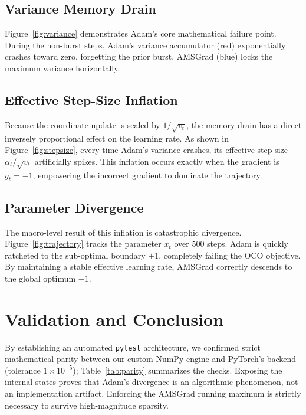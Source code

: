 \documentclass[10pt,twocolumn]{article}
\begin{document}
\subsection{Variance Memory Drain}
Figure~\ref{fig:variance} demonstrates Adam's core mathematical failure point. During the non-burst steps, Adam's variance accumulator (red) exponentially crashes toward zero, forgetting the prior burst. AMSGrad (blue) locks the maximum variance horizontally.

\subsection{Effective Step-Size Inflation}
Because the coordinate update is scaled by $1/\sqrt{v_t}$, the memory drain has a direct inversely proportional effect on the learning rate. As shown in Figure~\ref{fig:stepsize}, every time Adam's variance crashes, its effective step size $\alpha_t/\sqrt{v_t}$ artificially spikes. This inflation occurs exactly when the gradient is $g_t=-1$, empowering the incorrect gradient to dominate the trajectory.

\subsection{Parameter Divergence}
The macro-level result of this inflation is catastrophic divergence. Figure~\ref{fig:trajectory} tracks the parameter $x_t$ over 500 steps. Adam is quickly ratcheted to the sub-optimal boundary $+1$, completely failing the OCO objective. By maintaining a stable effective learning rate, AMSGrad correctly descends to the global optimum $-1$.

\section{Validation and Conclusion}
By establishing an automated \texttt{pytest} architecture, we confirmed strict mathematical parity between our custom NumPy engine and PyTorch's backend (tolerance $1\times10^{-5}$); Table~\ref{tab:parity} summarizes the checks. Exposing the internal states proves that Adam's divergence is an algorithmic phenomenon, not an implementation artifact. Enforcing the AMSGrad running maximum is strictly necessary to survive high-magnitude sparsity.
\end{document}
